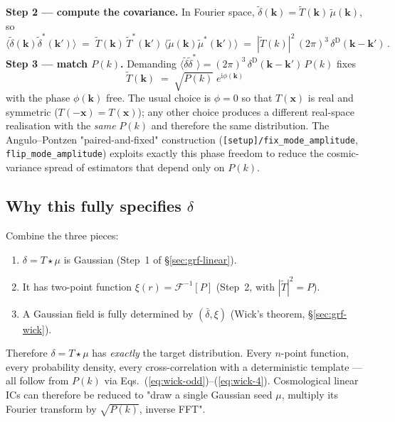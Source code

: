 \documentclass[12pt]{article}
\newcommand{\bk}{\mathbf{k}}
\newcommand{\bx}{\mathbf{x}}
\newcommand{\code}[1]{\texttt{#1}}
\begin{document}
\textbf{Step 2 --- compute the covariance.}  In Fourier space,
$\tilde\delta(\bk) = \tilde T(\bk)\,\tilde\mu(\bk)$, so
\begin{equation}
  \langle\tilde\delta(\bk)\tilde\delta^*(\bk')\rangle
  \;=\; \tilde T(\bk)\,\tilde T^*(\bk')\,
        \langle\tilde\mu(\bk)\tilde\mu^*(\bk')\rangle
  \;=\; |\tilde T(k)|^2\,(2\pi)^3\,\delta^\mathrm{D}(\bk-\bk')\,.
  \label{eq:grf-covar}
\end{equation}
\textbf{Step 3 --- match $P(k)$.}  Demanding
$\langle\tilde\delta\tilde\delta^*\rangle = (2\pi)^3\,
\delta^\mathrm{D}(\bk-\bk')\,P(k)$ fixes
\begin{equation}
  \boxed{\;\tilde T(\bk) \;=\; \sqrt{P(k)}\;e^{\mathrm i\phi(\bk)}\;}
  \label{eq:grf-T}
\end{equation}
with the phase $\phi(\bk)$ free.  The usual choice is $\phi = 0$
so that $T(\bx)$ is real and symmetric ($T(-\bx) = T(\bx)$); any
other choice produces a different real-space realisation with the
\emph{same} $P(k)$ and therefore the same distribution.  The
Angulo--Pontzen "paired-and-fixed" construction
(\code{[setup]/fix\_mode\_amplitude}, \code{flip\_mode\_amplitude})
exploits exactly this phase freedom to reduce the cosmic-variance
spread of estimators that depend only on $P(k)$.

\subsection{Why this fully specifies $\delta$}
\label{sec:grf-spec}

Combine the three pieces:
\begin{enumerate}
  \item $\delta = T\star\mu$ is Gaussian (Step~1 of
        \S\ref{sec:grf-linear}).
  \item It has two-point function $\xi(r) = \mathcal{F}^{-1}[P]$
        (Step~2, with $|\tilde T|^2 = P$).
  \item A Gaussian field is fully determined by
        $(\bar\delta, \xi)$ (Wick's theorem, \S\ref{sec:grf-wick}).
\end{enumerate}
Therefore $\delta = T\star\mu$ has \emph{exactly} the target
distribution.  Every $n$-point function, every probability density,
every cross-correlation with a deterministic template --- all
follow from $P(k)$ via Eqs.~(\ref{eq:wick-odd})--(\ref{eq:wick-4}).
Cosmological linear ICs can therefore be reduced to "draw a single
Gaussian seed $\mu$, multiply its Fourier transform by
$\sqrt{P(k)}$, inverse FFT".
\end{document}
